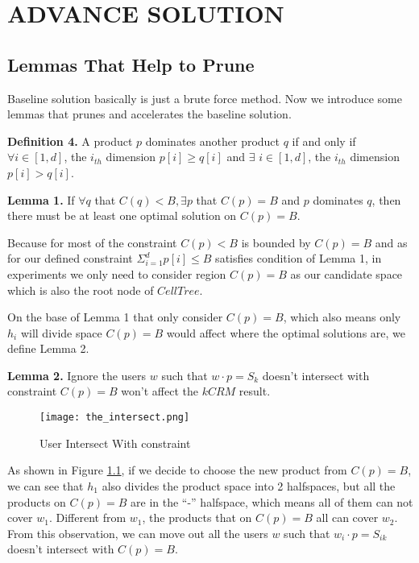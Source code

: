 \chapter{ADVANCE SOLUTION}
\label{chap:adva}

\section{Lemmas That Help to Prune}

Baseline solution basically is just a brute force method. Now we introduce some 
lemmas that prunes and accelerates the baseline solution.


{\bfseries Definition 4.} A product $p$ dominates another product $q$ 
if and only if $\forall i \in [1, d]$, the $i_{th}$ dimension $p[i] \geq q[i]$ and $\exists$ $i \in [1,d]$, the $i_{th}$ dimension $p[i]>q[i]$.

{\bfseries Lemma 1.} If  $\forall q$ that $C(q)<B, \exists p$ that $C(p)=B$ and $p$ dominates $q$, then there must be at least one optimal solution on $C(p)=B$.

Because for most of the constraint $C(p)<B$ is bounded by $C(p)=B$ and as for our defined 
constraint $\Sigma_{i=1}^d p[i] \leq B$ satisfies condition of Lemma 1, in 
experiments we only need to consider region $C(p)=B$ as our candidate space which is also the root node of $CellTree$.

On the base of Lemma 1 that only consider $C(p)=B$, which also means only $h_i$ will divide space 
$C(p)=B$ would affect where the optimal solutions are, we define Lemma 2.

{\bfseries Lemma 2.} Ignore the users $w$ such that $w\cdot p=S_k$ doesn't intersect with constraint $C(p)=B$ won't affect the $kCRM$ result.

\begin{figure}[hbt!]
  \centering
  \texttt{[image: the\_intersect.png]}
  \caption{User Intersect With constraint}
  \label{explain_intersect}
\end{figure}

As shown in Figure \ref{explain_intersect}, if we decide to choose the new product
 from $C(p)=B$, we can see that $h_1$ also divides the product space into 2
  halfspaces, but all the products on $C(p)=B$ are in the “-” halfspace, 
  which means all of them can not cover $w_1$. 
  Different from $w_1$, the products that on $C(p)=B$ all can cover $w_2$. 
  From this observation, we can move out all the users $w$ such that 
  $w_i \cdot p=S_{ik}$ doesn't intersect with $C(p)=B$.


